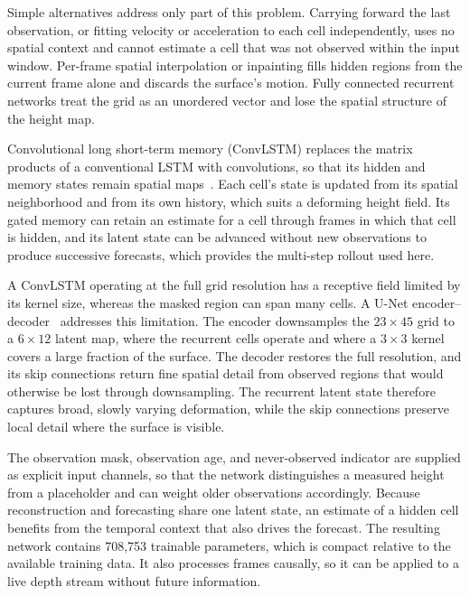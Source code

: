 Simple alternatives address only part of this problem. Carrying forward the last observation, or fitting velocity or acceleration to each cell independently, uses no spatial context and cannot estimate a cell that was not observed within the input window. Per-frame spatial interpolation or inpainting fills hidden regions from the current frame alone and discards the surface's motion. Fully connected recurrent networks treat the grid as an unordered vector and lose the spatial structure of the height map.

Convolutional long short-term memory (ConvLSTM) replaces the matrix products of a conventional LSTM with convolutions, so that its hidden and memory states remain spatial maps~\cite{shi2015convlstm}. Each cell's state is updated from its spatial neighborhood and from its own history, which suits a deforming height field. Its gated memory can retain an estimate for a cell through frames in which that cell is hidden, and its latent state can be advanced without new observations to produce successive forecasts, which provides the multi-step rollout used here.

A ConvLSTM operating at the full grid resolution has a receptive field limited by its kernel size, whereas the masked region can span many cells. A U-Net encoder--decoder~\cite{ronneberger2015unet} addresses this limitation. The encoder downsamples the $23 \times 45$ grid to a $6 \times 12$ latent map, where the recurrent cells operate and where a $3 \times 3$ kernel covers a large fraction of the surface. The decoder restores the full resolution, and its skip connections return fine spatial detail from observed regions that would otherwise be lost through downsampling. The recurrent latent state therefore captures broad, slowly varying deformation, while the skip connections preserve local detail where the surface is visible.

The observation mask, observation age, and never-observed indicator are supplied as explicit input channels, so that the network distinguishes a measured height from a placeholder and can weight older observations accordingly. Because reconstruction and forecasting share one latent state, an estimate of a hidden cell benefits from the temporal context that also drives the forecast. The resulting network contains 708,753 trainable parameters, which is compact relative to the available training data. It also processes frames causally, so it can be applied to a live depth stream without future information.

